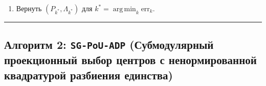 \documentclass[11pt,a4paper]{article}
\newcommand{\JJJ}{\mathcal{J}}
\DeclareMathOperator{\argmin}{arg\,min}
\theoremstyle{definition}
\theoremstyle{remark}
\begin{document}
\begin{enumerate}
\begin{enumerate}
        \item Вычислить направленные статистики $(I_j^{(k)}, U_j^{(k)})_{j \in \JJJ_0}$ и решить задачу \texttt{HPAO-LSMR} (или \texttt{grassman.solve}), получив $(P_{k+1}, \Lambda_{k+1})$.
        \item Вычислить ошибку прогноза $\mathrm{err}_k = \frac{1}{J_0}\sum_{j \in \JJJ_0}(Y_{i(j)} - S_j^{(k)})^2$ (или её LOO-версию по Лемме \ref{lem:loo_stop}).
        \item Если $h_k / a < h_{\min}$, завершить цикл. Иначе положить $h_{k+1} = h_k / a$ и найти методом бисекции наибольшее $\alpha_{k+1} \in [0,1]$, обеспечивающее $\frac{1}{J_0}\sum_{j \in \JJJ_0} N_j^{(k+1)}(\alpha_{k+1}; \widetilde{\Lambda}_{k+1}) \ge N_{\min}$.
    \end{enumerate}
    \item Вернуть $(P_{k^*}, \Lambda_{k^*})$ для $k^* = \argmin_k \mathrm{err}_k$.
\end{enumerate}
\noindent\rule{\textwidth}{0.8pt}

\subsection{Алгоритм 2: \texttt{SG-PoU-ADP} (Субмодулярный проекционный выбор центров с ненормированной квадратурой разбиения единства)}
\end{document}
